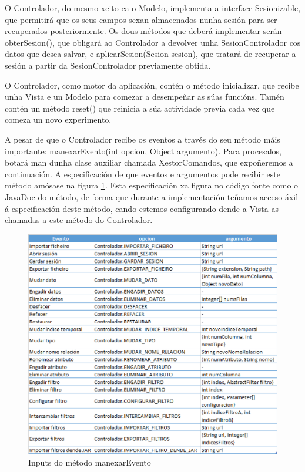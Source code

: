 O Controlador, do mesmo xeito ca o Modelo, implementa a interface Sesionizable, que permitirá que os seus campos sexan almacenados nunha sesión para ser recuperados posteriormente. Os dous métodos que deberá implementar serán obterSesion(), que obligará ao Controlador a devolver unha SesionControlador cos datos que desea salvar, e aplicarSesion(Sesion sesion), que tratará de recuperar a sesión a partir da SesionControlador previamente obtida.

O Controlador, como motor da aplicación, contén o método inicializar, que recibe unha Vista e un Modelo para comezar a desempeñar as súas funcións. Tamén contén un método reset() que reinicia a súa actividade previa cada vez que comeza un novo experimento.

A pesar de que o Controlador recibe os eventos a través do seu método máis importante: manexarEvento(int opcion, Object argumento). Para procesalos, botará man dunha clase auxiliar chamada XestorComandos, que expoñeremos a continuación. A especificación de que eventos e argumentos pode recibir este método amósase na figura \ref{manexarEvento}. Esta especificación xa figura no código fonte como o JavaDoc do método, de forma que durante a implementación teñamos acceso áxil á especificación deste método, cando estemos configurando dende a Vista as chamadas a este método do Controlador.

\begin{figure}
\centering
\includegraphics[width=\textwidth,height=\textheight,keepaspectratio]{figuras/manexarEvento}
\caption{Inputs do método manexarEvento}
\label{manexarEvento}
\end{figure}

